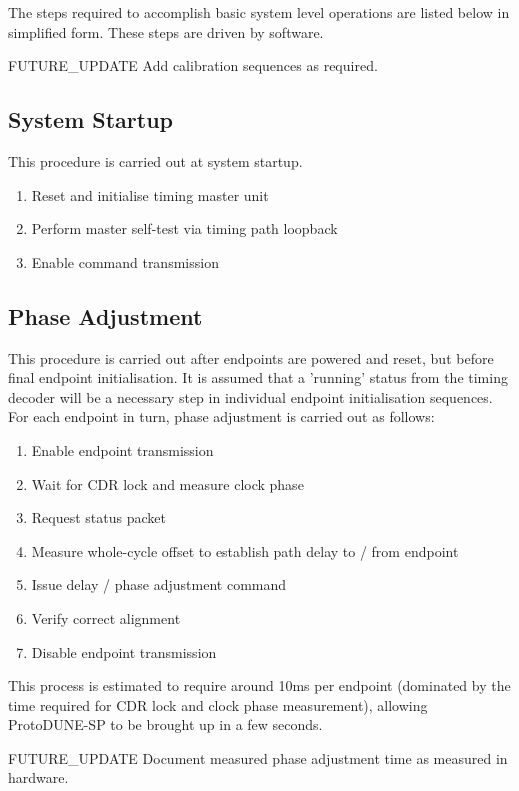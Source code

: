 \documentclass{dune}
\begin{document}
The steps required to accomplish basic system level operations are listed below in simplified form. These steps are driven by software.

{\color{red}FUTURE\_UPDATE} Add calibration sequences as required.

\subsection{System Startup}

This procedure is carried out at system startup.

\begin{enumerate}
	\item Reset and initialise timing master unit
	\item Perform master self-test via timing path loopback
	\item Enable command transmission
\end{enumerate}

\subsection{Phase Adjustment}

This procedure is carried out after endpoints are powered and reset, but before final endpoint initialisation. It is assumed that a 'running' status from the timing decoder will be a necessary step in individual endpoint initialisation sequences. For each endpoint in turn, phase adjustment is carried out as follows:

\begin{enumerate}
	\item Enable endpoint transmission
	\item Wait for CDR lock and measure clock phase
	\item Request status packet
	\item Measure whole-cycle offset to establish path delay to / from endpoint
	\item Issue delay / phase adjustment command
	\item Verify correct alignment
	\item Disable endpoint transmission
\end{enumerate}

This process is estimated to require around 10ms per endpoint (dominated by the time required for CDR lock and clock phase measurement), allowing ProtoDUNE-SP to be brought up in a few seconds.

{\color{red}FUTURE\_UPDATE} Document measured phase adjustment time as measured in hardware.
\end{document}
